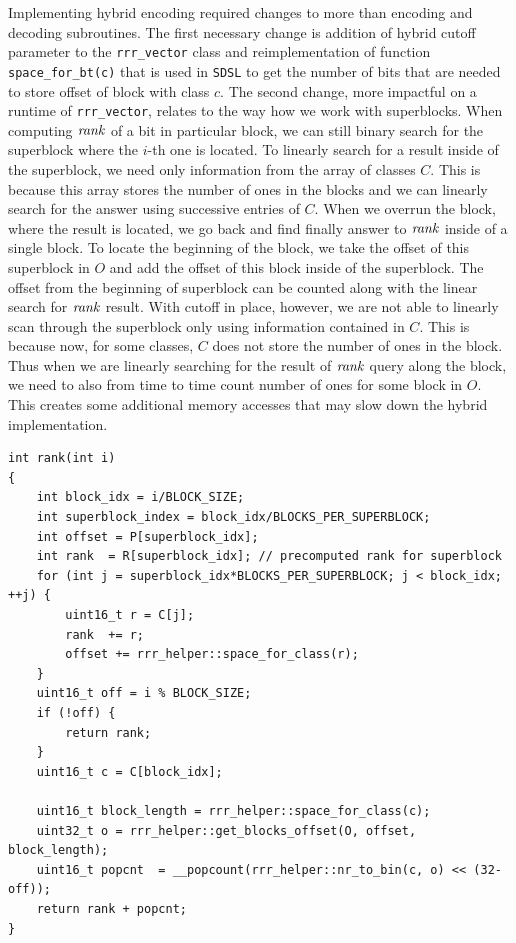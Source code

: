 Implementing hybrid encoding required changes to more than encoding and decoding
subroutines. The first necessary change is addition of hybrid cutoff parameter
to the \texttt{rrr\_vector} class and reimplementation of function \texttt{space\_for\_bt(c)}
that is used in \texttt{SDSL} to get the number of bits that are needed to store offset
of block with class $c$. The second change, more impactful on a runtime
of \texttt{rrr\_vector}, relates to the way how we work with superblocks. When
computing $\mathit{rank}$ of a bit in particular block, we can still binary search for
the superblock where the $i$-th one is located. To linearly search for a result
inside of the superblock, we need only information from the array of classes $C$.
This is because this array stores the number of ones in the blocks and we can linearly
search for the answer using successive entries of $C$. When we overrun the block, where
the result is located, we go back and find finally answer to $\mathit{rank}$ inside of a
single block. To locate the beginning of the block, we take the offset of this superblock
in $O$ and add the offset of this block inside of the superblock. The offset from the
beginning of superblock can be counted along with the linear search for $\mathit{rank}$ result.
With cutoff in place, however, we are not able to linearly scan through the superblock
only using information contained in $C$. This is because now, for some classes, $C$ does
not store the number of ones in the block. Thus when we are linearly searching for the result
of $\mathit{rank}$ query along the block, we need to also from time to time count number of ones
for some block in $O$. This creates some additional memory accesses that may slow down the
hybrid implementation.

\begin{lstlisting}
int rank(int i)
{
	int block_idx = i/BLOCK_SIZE;
	int superblock_index = block_idx/BLOCKS_PER_SUPERBLOCK;
	int offset = P[superblock_idx];
	int rank  = R[superblock_idx]; // precomputed rank for superblock
	for (int j = superblock_idx*BLOCKS_PER_SUPERBLOCK; j < block_idx; ++j) {
		uint16_t r = C[j];
		rank  += r;
		offset += rrr_helper::space_for_class(r);
	}
	uint16_t off = i % BLOCK_SIZE;
	if (!off) {
		return rank;
	}
	uint16_t c = C[block_idx];

	uint16_t block_length = rrr_helper::space_for_class(c);
	uint32_t o = rrr_helper::get_blocks_offset(O, offset, block_length);
	uint16_t popcnt  = __popcount(rrr_helper::nr_to_bin(c, o) << (32-off));
	return rank + popcnt;
}
\end{lstlisting}

